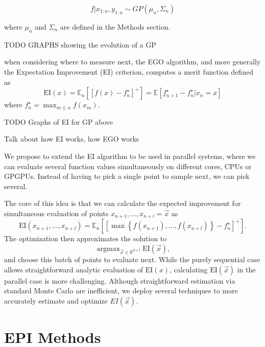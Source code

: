 \documentclass[phd,tocprelim]{cornell}
\DeclareMathOperator*{\argmax}{argmax}
\begin{document}
\begin{equation}
 f|x_{1:n}, y_{1:n} \sim GP(\mu_{n}, \Sigma_{n})
\end{equation}

where $\mu_{n}$ and $\Sigma_{n}$ are defined in the Methods section.

TODO
GRAPHS showing the evolution of a GP

when considering where to measure next, the EGO algorithm, and more generally the Expectation Improvement (EI) criterion, computes a merit function defined as
\begin{equation}
 \mbox{EI}(x) = \mathbb{E}_{n} \left[\left[ f(x) - f_{n}^{\star} \right]^{+} \right] = \mathbb{E} \left[ f_{n+1}^{\star} - f_{n}^{\star} | x_{n} = x\right]
\end{equation}
where $f_{n}^{\star} = \max_{m \leq n} f(x_{m})$.

TODO Graphs of EI for GP above

Talk about how EI works, how EGO works

We propose to extend the EI algorithm to be used in parallel systems, where we can evaluate several function values simultaneously on different cores, CPUs or GPGPUs. Instead of having to pick a single point to sample next, we can pick several.

The core of this idea is that we can calculate the expected improvement for simultaneous evaluation of points $x_{n+1}, \ldots, x_{n+l} = \vec{x}$ as
\begin{equation}
 \mbox{EI}(x_{n+1}, \ldots, x_{n+l}) = \mathbb{E}_{n}\left[\left[\max\left\{f(x_{n+1}), \ldots, f(x_{n+l})\right\} - f_{n}^{\star}\right]^{+}\right].
\end{equation}
The optimization then approximates the solution to
\begin{equation}
 \argmax_{\vec{x} \in \mathbb{R}^{d \times l}} \mbox{EI}(\vec{x}),
\end{equation}
and choose this batch of points to evaluate next. While the purely sequential case allows straightforward analytic evaluation of $\mbox{EI}(x)$, calculating $\mbox{EI}(\vec{x})$ in the parallel case is more challenging. Although straightforward estimation via standard Monte Carlo are inefficient, we deploy several techniques to more accurately estimate and optimize $EI(\vec{x})$.


\chapter{EPI Methods} %
\label{cha:EPI Methods}
\end{document}
